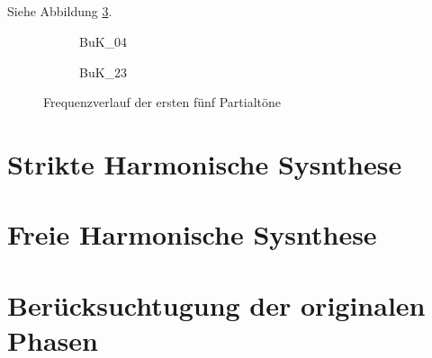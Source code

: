 \subsection{}
Siehe Abbildung \ref{fig:freq}.

\begin{figure}[H]
    \centering
    \begin{subfigure}{.5\textwidth}
        \centering
        \caption{BuK\_04}
        \scalebox{0.5}{}
        \label{fig:sub1}
    \end{subfigure}%
    \begin{subfigure}{.5\textwidth}
        \centering
        \caption{BuK\_23}
        \scalebox{0.5}{}
        \label{fig:sub2}
    \end{subfigure}
    \caption{Frequenzverlauf der ersten fünf Partialtöne}
    \label{fig:freq}
\end{figure}


\section{Strikte Harmonische Sysnthese}
\label{sec:2}

\subsection{}


\subsection{}


\section{Freie Harmonische Sysnthese}
\label{sec:3}

\subsection{}

\subsection{}


\section{Berücksuchtugung der originalen Phasen}
\label{sec:4}